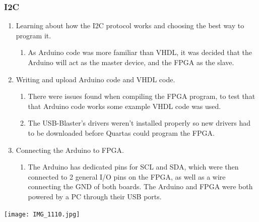 \documentclass{article}
\begin{document}
\subsubsection{I2C}
\begin{enumerate}
    \item Learning about how the I2C protocol works and choosing the best way to program it.
    \begin{enumerate}
        \item As Arduino code was more familiar than VHDL, it was decided that the Arduino will act as the master device, and the FPGA as the slave.
    \end{enumerate}
    \item Writing and upload Arduino code and VHDL code.
    \begin{enumerate}
        \item There were issues found when compiling the FPGA program, to test that that Arduino code works some example VHDL code was used.
        \item The USB-Blaster’s drivers weren’t installed properly so new drivers had to be downloaded before Quartas could program the FPGA.
    \end{enumerate}
    \item Connecting the Arduino to FPGA.
    \begin{enumerate}
        \item The Arduino has dedicated pins for SCL and SDA, which were then connected to 2 general I/O pins on the FPGA, as well as a wire connecting the GND of both boards. The Arduino and FPGA were both powered by a PC through their USB ports.
    \end{enumerate}
\end{enumerate}

\begin{center}
    \texttt{[image: IMG\_1110.jpg]}
\end{center}
\end{document}
